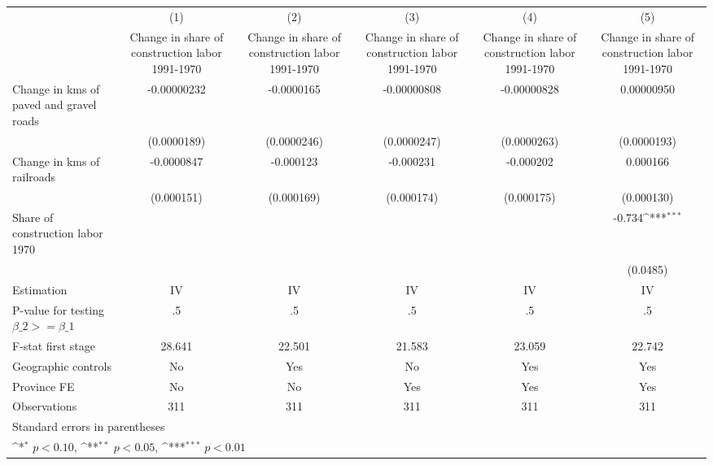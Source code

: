 {
\def\sym#1{\ifmmode^{#1}\else\(^{#1}\)\fi}
\begin{tabular}{l*{5}{c}}
\hline\hline
                    &\multicolumn{1}{c}{(1)}&\multicolumn{1}{c}{(2)}&\multicolumn{1}{c}{(3)}&\multicolumn{1}{c}{(4)}&\multicolumn{1}{c}{(5)}\\
                    &\multicolumn{1}{c}{Change in share of construction labor 1991-1970}&\multicolumn{1}{c}{Change in share of construction labor 1991-1970}&\multicolumn{1}{c}{Change in share of construction labor 1991-1970}&\multicolumn{1}{c}{Change in share of construction labor 1991-1970}&\multicolumn{1}{c}{Change in share of construction labor 1991-1970}\\
\hline
Change in kms of paved and gravel roads& -0.00000232         &  -0.0000165         & -0.00000808         & -0.00000828         &  0.00000950         \\
                    & (0.0000189)         & (0.0000246)         & (0.0000247)         & (0.0000263)         & (0.0000193)         \\
[1em]
Change in kms of railroads&  -0.0000847         &   -0.000123         &   -0.000231         &   -0.000202         &    0.000166         \\
                    &  (0.000151)         &  (0.000169)         &  (0.000174)         &  (0.000175)         &  (0.000130)         \\
[1em]
Share of construction labor 1970&                     &                     &                     &                     &      -0.734\sym{***}\\
                    &                     &                     &                     &                     &    (0.0485)         \\
\hline
Estimation          &          IV         &          IV         &          IV         &          IV         &          IV         \\
P-value for testing $\beta\_2 >= \beta\_1$&          .5         &          .5         &          .5         &          .5         &          .5         \\
F-stat first stage  &      28.641         &      22.501         &      21.583         &      23.059         &      22.742         \\
Geographic controls &          No         &         Yes         &          No         &         Yes         &         Yes         \\
Province FE         &          No         &          No         &         Yes         &         Yes         &         Yes         \\
Observations        &         311         &         311         &         311         &         311         &         311         \\
\hline\hline
\multicolumn{6}{l}{\footnotesize Standard errors in parentheses}\\
\multicolumn{6}{l}{\footnotesize \sym{*} \(p<0.10\), \sym{**} \(p<0.05\), \sym{***} \(p<0.01\)}\\
\end{tabular}
}
